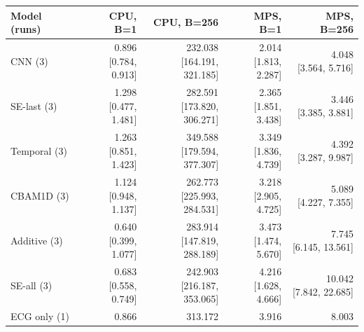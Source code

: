 \documentclass[11pt]{article}
\begin{document}
\begin{table}[!htbp]\centering\scriptsize\setlength{\tabcolsep}{3pt}
\begin{tabular}{lrrrr}\toprule
Model (runs) & CPU, B=1 & CPU, B=256 & MPS, B=1 & MPS, B=256\\\midrule
CNN (3) & \shortstack{0.896\\{[0.784, 0.913]}} & \shortstack{232.038\\{[164.191, 321.185]}} & \shortstack{2.014\\{[1.813, 2.287]}} & \shortstack{4.048\\{[3.564, 5.716]}}\\
SE-last (3) & \shortstack{1.298\\{[0.477, 1.481]}} & \shortstack{282.591\\{[173.820, 306.271]}} & \shortstack{2.365\\{[1.851, 3.438]}} & \shortstack{3.446\\{[3.385, 3.881]}}\\
Temporal (3) & \shortstack{1.263\\{[0.851, 1.423]}} & \shortstack{349.588\\{[179.594, 377.307]}} & \shortstack{3.349\\{[1.836, 4.739]}} & \shortstack{4.392\\{[3.287, 9.987]}}\\
CBAM1D (3) & \shortstack{1.124\\{[0.948, 1.137]}} & \shortstack{262.773\\{[225.993, 284.531]}} & \shortstack{3.218\\{[2.905, 4.725]}} & \shortstack{5.089\\{[4.227, 7.355]}}\\
Additive (3) & \shortstack{0.640\\{[0.399, 1.077]}} & \shortstack{283.914\\{[147.819, 288.189]}} & \shortstack{3.473\\{[1.474, 5.670]}} & \shortstack{7.745\\{[6.145, 13.561]}}\\
SE-all (3) & \shortstack{0.683\\{[0.558, 0.749]}} & \shortstack{242.903\\{[216.187, 353.065]}} & \shortstack{4.216\\{[1.628, 4.666]}} & \shortstack{10.042\\{[7.842, 22.685]}}\\
ECG only (1) & 0.866 & 313.172 & 3.916 & 8.003\\

\end{tabular}
\end{table}
\end{document}
